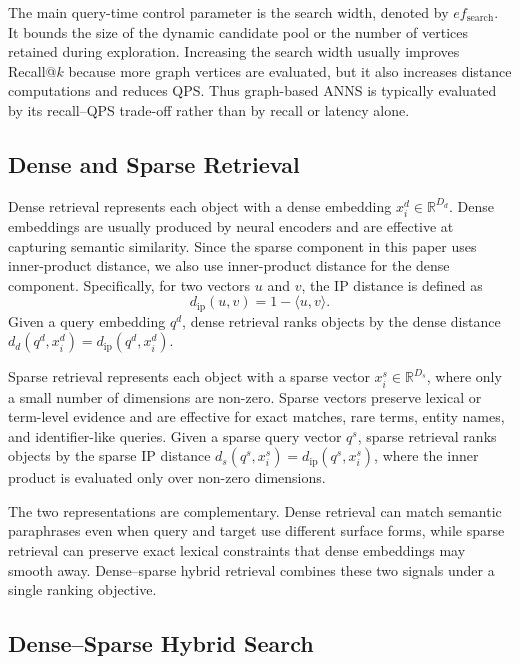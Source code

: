 The main query-time control parameter is the search width, denoted by $ef_{\mathrm{search}}$. It bounds the size of the dynamic candidate pool or the number of vertices retained during exploration. Increasing the search width usually improves Recall@$k$ because more graph vertices are evaluated, but it also increases distance computations and reduces QPS. Thus graph-based ANNS is typically evaluated by its recall--QPS trade-off rather than by recall or latency alone.

\subsection{Dense and Sparse Retrieval}

Dense retrieval represents each object with a dense embedding $x_i^d\in\mathbb{R}^{D_d}$. Dense embeddings are usually produced by neural encoders and are effective at capturing semantic similarity. Since the sparse component in this paper uses inner-product distance, we also use inner-product distance for the dense component. Specifically, for two vectors $u$ and $v$, the IP distance is defined as
\begin{equation}
    d_{\mathrm{ip}}(u,v)=1-\langle u,v\rangle.
\end{equation}
Given a query embedding $q^d$, dense retrieval ranks objects by the dense distance $d_d(q^d,x_i^d)=d_{\mathrm{ip}}(q^d,x_i^d)$.

Sparse retrieval represents each object with a sparse vector $x_i^s\in\mathbb{R}^{D_s}$, where only a small number of dimensions are non-zero. Sparse vectors preserve lexical or term-level evidence and are effective for exact matches, rare terms, entity names, and identifier-like queries. Given a sparse query vector $q^s$, sparse retrieval ranks objects by the sparse IP distance $d_s(q^s,x_i^s)=d_{\mathrm{ip}}(q^s,x_i^s)$, where the inner product is evaluated only over non-zero dimensions.

The two representations are complementary. Dense retrieval can match semantic paraphrases even when query and target use different surface forms, while sparse retrieval can preserve exact lexical constraints that dense embeddings may smooth away. Dense--sparse hybrid retrieval combines these two signals under a single ranking objective.

\subsection{Dense--Sparse Hybrid Search}

